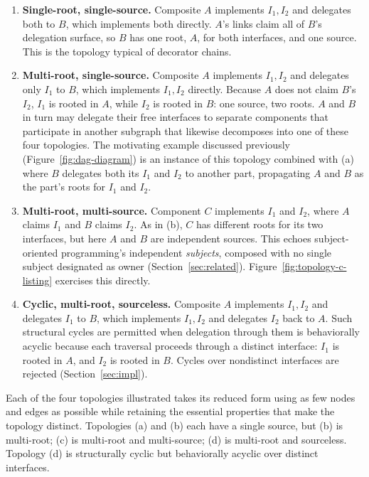 \documentclass[acmsmall,nonacm]{acmart}
\theoremstyle{acmplain}
\begin{document}
\begin{enumerate}
\item[(a)] \textbf{Single-root, single-source.}
Composite $A$ implements $I_1, I_2$ and delegates both to $B$, which
implements both directly. $A$'s links claim all of $B$'s delegation surface,
so $B$ has one root, $A$, for both interfaces, and one source. This is the
topology typical of decorator chains.

\item[(b)] \textbf{Multi-root, single-source.}
Composite $A$ implements $I_1, I_2$ and delegates only $I_1$ to $B$,
which implements $I_1, I_2$ directly. Because $A$ does not claim $B$'s $I_2$,
$I_1$ is rooted in $A$, while $I_2$ is rooted in $B$: one source, two roots.
$A$ and $B$ in turn may delegate their free interfaces to separate components that
participate in another subgraph that likewise decomposes into one of
these four topologies. The motivating example discussed previously
(Figure~\ref{fig:dag-diagram}) is an instance of this topology combined with (a)
where $B$ delegates both its $I_1$ and $I_2$ to another part,
propagating $A$ and $B$ as the part's roots for $I_1$ and $I_2$.

\item[(c)] \textbf{Multi-root, multi-source.}
Component $C$ implements $I_1$ and $I_2$, where $A$ claims $I_1$ and
$B$ claims $I_2$. As in (b), $C$ has different roots for its two
interfaces, but here $A$ and $B$ are independent sources. This echoes
subject-oriented programming's independent \emph{subjects}, composed
with no single subject designated as owner (Section~\ref{sec:related}).
Figure~\ref{fig:topology-c-listing} exercises this directly.

\item[(d)] \textbf{Cyclic, multi-root, sourceless.}
Composite $A$ implements $I_1, I_2$ and delegates $I_1$ to $B$, which
implements $I_1, I_2$ and delegates $I_2$ back to $A$. Such structural cycles are
permitted when delegation through them is behaviorally acyclic
because each traversal proceeds through a distinct interface: $I_1$
is rooted in $A$, and $I_2$ is rooted in $B$. Cycles over nondistinct interfaces
are rejected (Section~\ref{sec:impl}).
\end{enumerate}

Each of the four topologies illustrated takes its reduced form using as few nodes and edges as possible while retaining
the essential properties that make the topology distinct. Topologies (a) and (b) each have a single source, but (b) is multi-root;
(c) is multi-root and multi-source; (d) is multi-root and sourceless. Topology (d) is structurally cyclic but behaviorally
acyclic over distinct interfaces.
\end{document}
